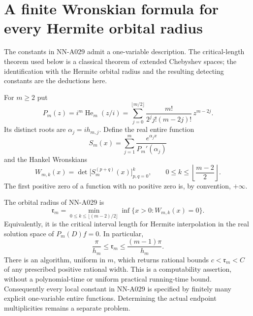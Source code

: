 \section{A finite Wronskian formula for every Hermite orbital radius}
\label{sec:analytic-orbital-wronskians}

The constants in NN-A029 admit a one-variable description. The
critical-length theorem used below is a classical theorem of extended
Chebyshev spaces; the identification with the Hermite orbital radius
and the resulting detecting constants are the deductions here.

For $m\ge2$ put
\begin{equation}\label{eq:analytic-hermite-ode}
 P_m(z)=i^m\operatorname{He}_m(z/i)
 =\sum_{j=0}^{\lfloor m/2\rfloor}
       \frac{m!}{2^j j!(m-2j)!}\,z^{m-2j}.
\end{equation}
Its distinct roots are $\alpha_j=ih_{m,j}$. Define the real entire
function
\begin{equation}\label{eq:analytic-fundamental-solution}
 S_m(x)=\sum_{j=1}^m\frac{e^{\alpha_jx}}{P_m'(\alpha_j)}
\end{equation}
and the Hankel Wronskians
\begin{equation}\label{eq:analytic-finite-wronskians}
 W_{m,k}(x)=\det\bigl[S_m^{(p+q)}(x)\bigr]_{p,q=0}^k,
 \qquad 0\le k\le\left\lfloor\frac{m-2}{2}\right\rfloor.
\end{equation}
The first positive zero of a function with no positive zero is, by
convention, $+\infty$.

\begin{theorem}
\label{thm:analytic-orbital-wronskians}
The orbital radius of NN-A029 is
\begin{equation}\label{eq:analytic-wronskian-radius}
 \boxed{\displaystyle
 \mathfrak r_m=
 \min_{0\le k\le\lfloor(m-2)/2\rfloor}
        \inf\{x>0:W_{m,k}(x)=0\}.}
\end{equation}
Equivalently, it is the critical interval length for Hermite
interpolation in the real solution space of $P_m(D)f=0$.
In particular,
\begin{equation}\label{eq:analytic-radius-elementary-bounds}
       \frac\pi{h_m}\le\mathfrak r_m
                         \le\frac{(m-1)\pi}{h_m}.
\end{equation}
There is an algorithm, uniform in $m$, which returns rational bounds
$c<\mathfrak r_m<C$ of any prescribed positive rational width.
This is a computability assertion, without a polynomial-time or
uniform practical running-time bound. Consequently every local
constant in NN-A029 is specified by finitely many explicit
one-variable entire functions. Determining the actual endpoint
multiplicities remains a separate problem.
\end{theorem}

